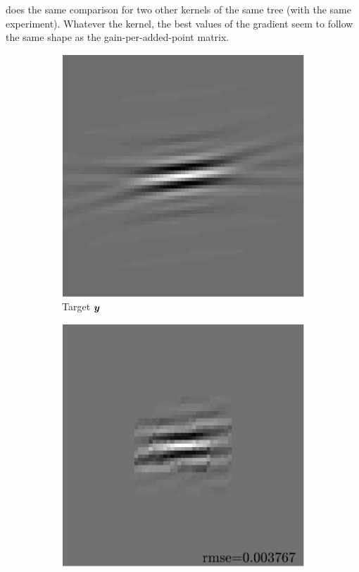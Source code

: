 \noindent
{} does the same comparison for two other kernels of the same tree (with the same experiment). Whatever the kernel, the best values of the gradient seem to follow the same shape as the gain-per-added-point matrix. 

\begin{figure}[!ht]\centering
	\begin{subfigure}[b]{0.22\textwidth}\centering
	\includegraphics[width=\textwidth]{figures/xp/tilted_n4/xp_128x128_sc2_angl4_K3_S3_node4_target.pdf}
	\caption{Target $\bm{y}$}
	\end{subfigure}
	\begin{subfigure}[b]{0.22\textwidth}\centering
	\includegraphics[width=\textwidth]{figures/xp/tilted_n4/xp_128x128_sc2_angl4_K3_S3_node4_approx.pdf}

\end{subfigure}
\end{figure}

